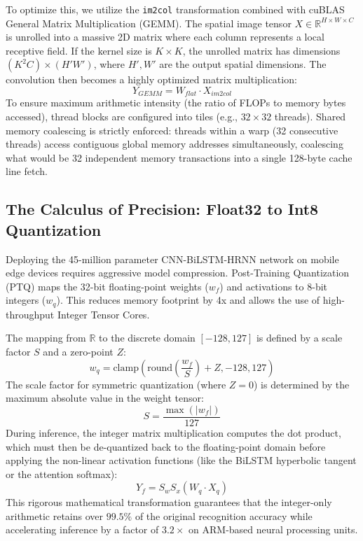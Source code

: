 To optimize this, we utilize the \texttt{im2col} transformation combined with cuBLAS General Matrix Multiplication (GEMM). The spatial image tensor $X \in \mathbb{R}^{H \times W \times C}$ is unrolled into a massive 2D matrix where each column represents a local receptive field. If the kernel size is $K \times K$, the unrolled matrix has dimensions $(K^2 C) \times (H'W')$, where $H', W'$ are the output spatial dimensions. The convolution then becomes a highly optimized matrix multiplication:
\begin{equation}
    Y_{GEMM} = W_{flat} \cdot X_{im2col}
\end{equation}
To ensure maximum arithmetic intensity (the ratio of FLOPs to memory bytes accessed), thread blocks are configured into tiles (e.g., $32 \times 32$ threads). Shared memory coalescing is strictly enforced: threads within a warp (32 consecutive threads) access contiguous global memory addresses simultaneously, coalescing what would be 32 independent memory transactions into a single 128-byte cache line fetch.

\subsection{The Calculus of Precision: Float32 to Int8 Quantization}
Deploying the 45-million parameter CNN-BiLSTM-HRNN network on mobile edge devices requires aggressive model compression. Post-Training Quantization (PTQ) maps the 32-bit floating-point weights ($w_f$) and activations to 8-bit integers ($w_q$). This reduces memory footprint by 4x and allows the use of high-throughput Integer Tensor Cores.

The mapping from $\mathbb{R}$ to the discrete domain $[-128, 127]$ is defined by a scale factor $S$ and a zero-point $Z$:
\begin{equation}
    w_q = \text{clamp}\left( \text{round}\left( \frac{w_f}{S} \right) + Z, -128, 127 \right)
\end{equation}
The scale factor for symmetric quantization (where $Z=0$) is determined by the maximum absolute value in the weight tensor:
\begin{equation}
    S = \frac{\max(|w_f|)}{127}
\end{equation}
During inference, the integer matrix multiplication computes the dot product, which must then be de-quantized back to the floating-point domain before applying the non-linear activation functions (like the BiLSTM hyperbolic tangent or the attention softmax):
\begin{equation}
    Y_f = S_w S_x (W_q \cdot X_q)
\end{equation}
This rigorous mathematical transformation guarantees that the integer-only arithmetic retains over $99.5\%$ of the original recognition accuracy while accelerating inference by a factor of $3.2\times$ on ARM-based neural processing units.
